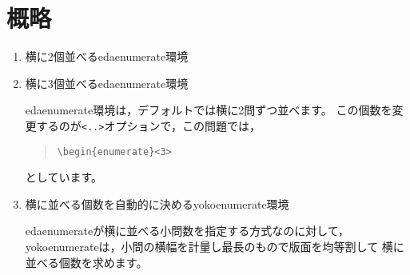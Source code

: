 \documentclass[a4j]{jarticle}
\begin{document}
\section{概略}
\begin{enumerate}
\item 横に2個並べる\textsf{edaenumerate}環境

\item 横に3個並べる\textsf{edaenumerate}環境

  \textsf{edaenumerate}環境は，デフォルトでは横に2問ずつ並べます。
  この個数を変更するのが\verb+<..>+オプションで，この問題では，
  \begin{quote}
  \verb+\begin{enumerate}<3>+
  \end{quote}
  としています。

\item 横に並べる個数を自動的に決める\textsf{yokoenumerate}環境

  \textsf{edaenumerate}が横に並べる小問数を指定する方式なのに対して，
  \textsf{yokoenumerate}は，小問の横幅を計量し最長のもので版面を均等割して
  横に並べる個数を求めます。


\end{enumerate}
\end{document}
